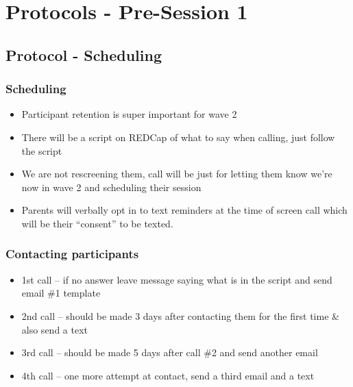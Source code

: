 \documentclass[]{book}
\providecommand{\tightlist}{%
  \setlength{\itemsep}{0pt}\setlength{\parskip}{0pt}}
\begin{document}
\hypertarget{protocols---pre-session-1-1}{%
\section{Protocols - Pre-Session 1}\label{protocols---pre-session-1-1}}

\hypertarget{protocol---scheduling}{%
\subsection{Protocol - Scheduling}\label{protocol---scheduling}}

\hypertarget{scheduling-1}{%
\subsubsection{Scheduling}\label{scheduling-1}}

\begin{itemize}
\tightlist
\item
  Participant retention is super important for wave 2
\item
  There will be a script on REDCap of what to say when calling, just follow the script
\item
  We are not rescreening them, call will be just for letting them know we're now in wave 2 and scheduling their session
\item
  Parents will verbally opt in to text reminders at the time of screen call which will be their ``consent'' to be texted.
\end{itemize}

\hypertarget{contacting-participants}{%
\subsubsection{Contacting participants}\label{contacting-participants}}

\begin{itemize}
\tightlist
\item
  1st call -- if no answer leave message saying what is in the script and send email \#1 template
\item
  2nd call -- should be made 3 days after contacting them for the first time \& also send a text
\item
  3rd call -- should be made 5 days after call \#2 and send another email
\item
  4th call -- one more attempt at contact, send a third email and a text
\end{itemize}
\end{document}
